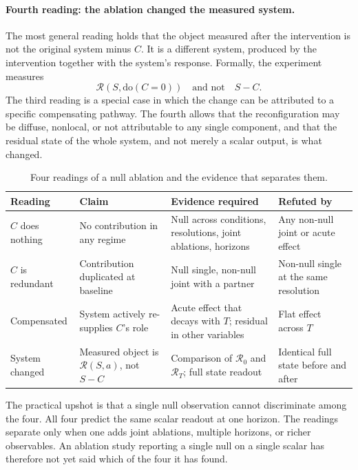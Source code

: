 \documentclass[11pt]{article}
\theoremstyle{definition}
\theoremstyle{remark}
\newcommand{\Rop}{\mathcal{R}}
\newcommand{\dox}[1]{\mathrm{do}(#1)}
\begin{document}
\paragraph{Fourth reading: the ablation changed the measured system.}
The most general reading holds that the object measured after the intervention is not the original system minus $C$. It is a different system, produced by the intervention together with the system's response. Formally, the experiment measures
\[
\Rop(S,\dox{C=0})\quad\text{and not}\quad S-C .
\]
The third reading is a special case in which the change can be attributed to a specific compensating pathway. The fourth allows that the reconfiguration may be diffuse, nonlocal, or not attributable to any single component, and that the residual state of the whole system, and not merely a scalar output, is what changed.

\begin{table}[h]
\centering
\small
\begin{tabular}{p{2.6cm}p{3.6cm}p{4.3cm}p{3.2cm}}
\toprule
Reading & Claim & Evidence required & Refuted by\\
\midrule
$C$ does nothing & No contribution in any regime & Null across conditions, resolutions, joint ablations, horizons & Any non-null joint or acute effect\\
$C$ is redundant & Contribution duplicated at baseline & Null single, non-null joint with a partner & Non-null single at the same resolution\\
Compensated & System actively re-supplies $C$'s role & Acute effect that decays with $T$; residual in other variables & Flat effect across $T$\\
System changed & Measured object is $\Rop(S,a)$, not $S-C$ & Comparison of $\Rop_0$ and $\Rop_T$; full state readout & Identical full state before and after\\
\bottomrule
\end{tabular}
\caption{Four readings of a null ablation and the evidence that separates them.}
\end{table}

The practical upshot is that a single null observation cannot discriminate among the four. All four predict the same scalar readout at one horizon. The readings separate only when one adds joint ablations, multiple horizons, or richer observables. An ablation study reporting a single null on a single scalar has therefore not yet said which of the four it has found.

\end{document}
